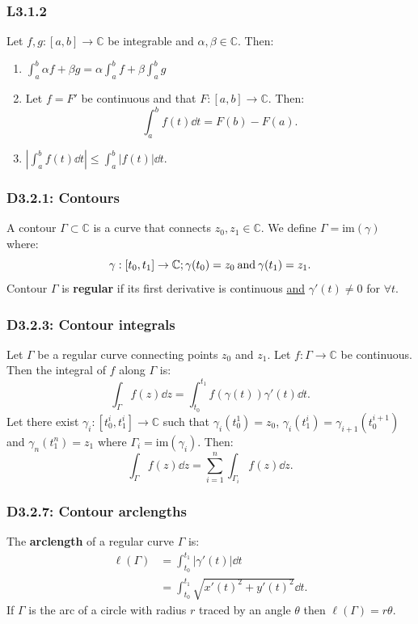 \documentclass{article}
\begin{document}
\begin{multicols*}{3}
\subsubsection*{L3.1.2}
Let $f,g:[a,b]\rightarrow\mathbb{C}$ be integrable
and $\alpha,\beta\in\mathbb{C}$. Then:
\begin{enumerate}
    \item $\displaystyle\int_{a}^{b}\alpha f+\beta g
    =\alpha\int_{a}^{b}f+\beta\int_{a}^{b}g$

    \item Let $f=F'$ be continuous and that
    $F:[a,b]\rightarrow\mathbb{C}$. Then:
    $$\int_{a}^{b}f(t)\dd t=F(b)-F(a).$$

    \item $\displaystyle\left|\int_{a}^{b}f(t)\dd t\right|
    \leq\int_{a}^{b}|f(t)|\dd t$.
\end{enumerate}

\subsubsection*{D3.2.1: Contours}
A contour $\Gamma\subset\mathbb{C}$ is a curve that
connects $z_0,z_1\in\mathbb{C}$.
We define $\Gamma=\text{im}(\gamma)$ where:
$$\gamma:[t_0,t_1]\rightarrow\mathbb{C};
\gamma(t_0)=z_0\hspace{0.03in}
\text{and}\hspace{0.03in}\gamma(t_1)=z_1.$$
Contour $\Gamma$ is \textbf{regular} if its first derivative
is continuous \underline{and} $\gamma'(t)\neq0$ for $\forall t$.

\subsubsection*{D3.2.3: Contour integrals}
Let $\Gamma$ be a regular curve connecting points $z_0$ and $z_1$.
Let $f:\Gamma\rightarrow\mathbb{C}$ be continuous. Then the integral
of $f$ along $\Gamma$ is:
$$\int_{\Gamma}f(z)\dd z=\int_{t_0}^{t_1}f(\gamma(t))\gamma'(t)\dd t.$$
Let there exist $\gamma_i:[t_0^i,t_1^i]\rightarrow\mathbb{C}$ such that
$\gamma_i(t_0^1)=z_0$, $\gamma_i(t_1^i)=\gamma_{i+1}(t_0^{i+1})$ and
$\gamma_n(t_1^n)=z_1$ where $\Gamma_i=\text{im}(\gamma_i)$. Then:
$$\int_{\Gamma}f(z)\dd z=\sum_{i=1}^{n}\int_{\Gamma_i}f(z)\dd z.$$

\subsubsection*{D3.2.7: Contour arclengths}
The \textbf{arclength} of a regular curve $\Gamma$ is:
\begin{align*}
    \ell(\Gamma)
    &=\int_{t_0}^{t_1}|\gamma'(t)|\dd t \\
    &=\int_{t_0}^{t_1}\sqrt{x'(t)^2+y'(t)^2}\dd t.
\end{align*}
If $\Gamma$ is the arc of a circle with radius $r$ traced
by an angle $\theta$ then $\ell(\Gamma)=r\theta$.


\end{multicols*}
\end{document}
